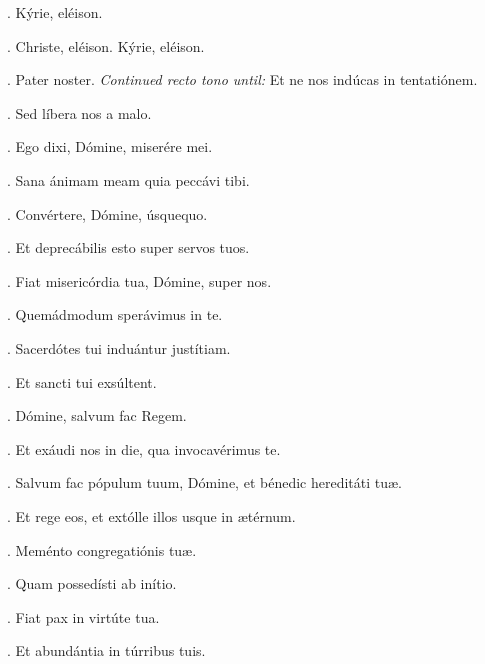 \begin{versicles}
\Vbar. Kýrie, eléison.

\Rbar. Christe, eléison. Kýrie, eléison.
\end{versicles}

\begin{versicles}
\Vbar. Pater noster.
\textit{Continued recto tono until:}
Et ne nos indúcas in tentatiónem.

\Rbar. Sed líbera nos a malo.
\end{versicles}

\begin{versicles}
\Vbar. Ego dixi, Dómine, miserére mei.

\Rbar. Sana ánimam meam quia peccávi tibi.
\end{versicles}

\begin{versicles}
\Vbar. Convértere, Dómine, úsquequo.

\Rbar. Et deprecábilis esto super servos tuos.
\end{versicles}

\begin{versicles}
\Vbar. Fiat misericórdia tua, Dómine, super nos.

\Rbar. Quemádmodum sperávimus in te.
\end{versicles}

\begin{versicles}
\Vbar. Sacerdótes tui induántur justítiam.

\Rbar. Et sancti tui exsúltent.
\end{versicles}

\begin{versicles}
\Vbar. Dómine, salvum fac Regem.

\Rbar. Et exáudi nos in die, qua invocavérimus te.
\end{versicles}

\begin{versicles}
\Vbar. Salvum fac pópulum tuum, Dómine, et bénedic hereditáti tuæ.

\Rbar. Et rege eos, et extólle illos usque in ætérnum.
\end{versicles}

\begin{versicles}
\Vbar. Meménto congregatiónis tuæ.

\Rbar. Quam possedísti ab inítio.
\end{versicles}

\begin{versicles}
\Vbar. Fiat pax in virtúte tua.

\Rbar. Et abundántia in túrribus tuis.
\end{versicles}

